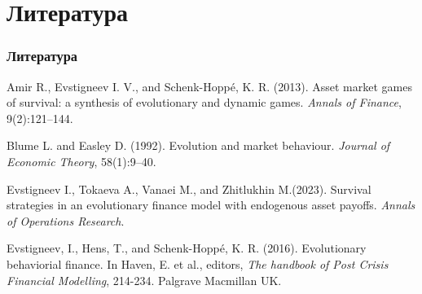 \documentclass[10pt]{beamer}
\theoremstyle{definition}
\theoremstyle{remark}
\begin{document}

\section{Литература}
\begin{frame}\frametitle{Литература}
\begin{thebibliography}{6}



 Amir R., Evstigneev I. V., and Schenk-Hoppé, K. R. (2013).
\newblock Asset market games of survival: a synthesis of evolutionary and dynamic games.
{\em Annals of Finance}, 9(2):121–144.


 Blume L. and Easley D. (1992).
\newblock Evolution and market behaviour.
{\em Journal of Economic Theory}, 58(1):9–40.


 Evstigneev I., Tokaeva A., Vanaei M., and Zhitlukhin M.(2023).
\newblock Survival strategies in an evolutionary finance model with endogenous asset payoffs.
{\em Annals of Operations Research}.


 Evstigneev, I., Hens, T., and Schenk-Hoppé, K. R. (2016).
\newblock Evolutionary behaviorial finance. In Haven, E. et al., editors, 
{\em The handbook of Post Crisis Financial Modelling}, 214-234. Palgrave Macmillan UK.


\end{thebibliography}
\end{frame}

\begin{frame}
\end{frame}


\end{document}
